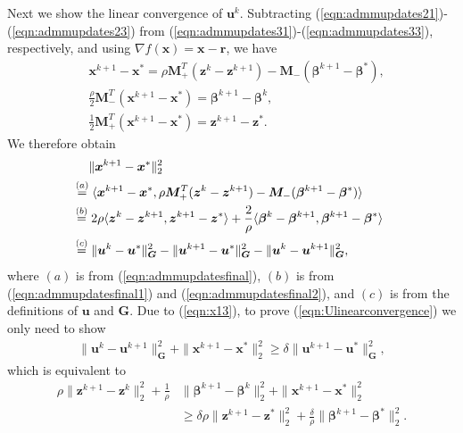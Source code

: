 \documentclass[journal]{IEEEtran}
\newcommand{\nn}{\nonumber}
\begin{document}
\begin{IEEEproof}
Next we show the linear convergence of $\bm u^k$. Subtracting (\ref{eqn:admmupdates21})-(\ref{eqn:admmupdates23}) from (\ref{eqn:admmupdates31})-(\ref{eqn:admmupdates33}), respectively, and using $\nabla f(\bm x)=\bm x-\bm r$, we have
\begin{align}
\label{eqn:admmupdatesfinal}
&\bm x^{k+1}-\bm x^*=\rho\bm M_+^T(\bm z^k-\bm z^{k+1})-\bm M_-(\bm \beta^{k+1}-\bm\beta^*),\\
\label{eqn:admmupdatesfinal1}
&\frac{\rho}{2}\bm M_-^T(\bm x^{k+1}-\bm x^*)=\bm\beta^{k+1}-\bm\beta^k,\\
\label{eqn:admmupdatesfinal2}
&\frac{1}{2}\bm M_+^T(\bm x^{k+1}-\bm x^*)=\bm z^{k+1}-\bm z^*.
\end{align}
We therefore obtain 
\begin{align}
&\hspace{-0.08in}~~~~\|\bm x^{k+1}-\bm x^*\|_2^2\nn\\
&\hspace{-0.08in}\stackrel{(a)}{=}\langle \bm x^{k+1}-\bm x^*,\rho\bm M_+^T(\bm z^k-\bm z^{k+1})-\bm M_-(\bm\beta^{k+1}-\bm\beta^*)\rangle\nn\\
&\hspace{-0.08in}\stackrel{(b)}{=}2\rho\langle \bm z^k-\bm z^{k+1},\bm z^{k+1}-\bm z^* \rangle + \frac{2}{\rho} \langle\bm \beta^k-\bm\beta^{k+1},\bm\beta^{k+1}-\bm\beta^*\rangle\nn\\
\label{eqn:x13}
&\hspace{-0.08in}\stackrel{(c)}{=}\|\bm u^k-\bm u^*\|_{\bm G}^2-\|\bm u^{k+1}-\bm u^*\|_{\bm G}^2-\|\bm u^k-\bm u^{k+1}\|_{\bm G}^2,
\end{align}
where $(a)$ is from (\ref{eqn:admmupdatesfinal}), $(b)$ is from (\ref{eqn:admmupdatesfinal1}) and (\ref{eqn:admmupdatesfinal2}), and $(c)$ is from the definitions of $\bm u$ and $\bm G$. Due to (\ref{eqn:x13}), to prove (\ref{eqn:Ulinearconvergence}) we only need to show
\begin{equation}
\begin{aligned}
\|\bm u^k-\bm u^{k+1}\|_{\bm G}^2 + \|\bm x^{k+1}-\bm x^*\|_2^2\geq\delta\|\bm u^{k+1}-\bm u^*\|_{\bm G}^2,\nn
\end{aligned}
\end{equation}
which is equivalent to 
\begin{equation}
\begin{aligned}
\rho\|\bm z^{k+1}-\bm z^k\|_2^2+\frac{1}{\rho}&\|\bm\beta^{k+1}-\bm\beta^k\|_2^2+\|\bm x^{k+1}-\bm x^*\|_2^2\nn\\&\geq\delta\rho\|\bm z^{k+1}-\bm z^*\|_2^2+\frac{\delta}{\rho}\|\bm\beta^{k+1}-\bm\beta^*\|_2^2.\nn

\end{aligned}
\end{equation}
\end{IEEEproof}
\end{document}
